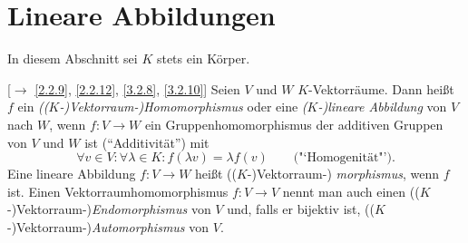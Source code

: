 \documentclass[../../main.tex]{subfiles}
\begin{document}

\section{Lineare Abbildungen}

\noindent
In diesem Abschnitt sei $K$ stets ein Körper.

\begin{df}\label{6.3.1}\mbox{}
[$\to$ \ref{2.2.9}, \ref{2.2.12}, \ref{3.2.8}, \ref{3.2.10}] Seien $V$ und $W$ $K$-Vektorräume. Dann heißt $f$ ein \emph{(($K$-)Vektorraum-)Homomorphismus} oder eine \emph{($K$-)lineare Abbildung} von $V$ nach $W$, wenn $f:V\to W$ ein Gruppenhomomorphismus der additiven Gruppen
von $V$ und $W$ ist ("`Additivität"') mit
\[\forall v\in V:\forall\lambda\in K: f(\lambda v) =\lambda f(v)\qquad\text{("`Homogenität"')}.\]
Eine lineare Abbildung $f\colon V\to W$ heißt (($K$-)Vektorraum-) \emph{morphismus}, wenn $f$  ist. Einen Vektorraumhomomorphismus $f:V\to V$ nennt man auch einen (($K$-)Vektorraum-)\emph{Endomorphismus} von $V$ und, falls er bijektiv ist, (($K$-)Vektorraum-)\emph{Automorphismus} von $V$.
\end{df}
\end{document}
